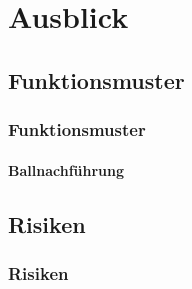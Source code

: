 \section{Ausblick}

\subsection{Funktionsmuster}
\begin{frame}
	\frametitle{Funktionsmuster\hfill{}\footnotesize \group}
	\framesubtitle{Ballnachführung}
\end{frame}

\subsection{Risiken}
\begin{frame}
	\frametitle{Risiken \hfill{} \footnotesize \group}

\end{frame}
